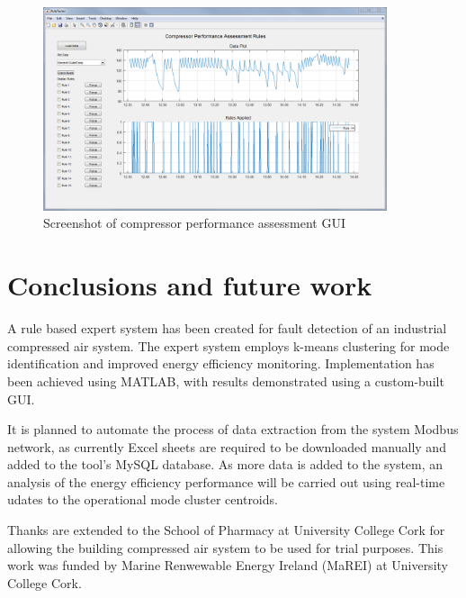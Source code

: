\begin{figure}
\includegraphics[width = 0.9\textwidth]{./Images/RuleTester.png}
\caption{Screenshot of compressor performance assessment GUI}
\label{fig:ruletester}
\end{figure}


\section{Conclusions and future work}
\label{sec:conclusions}
A rule based expert system has been created for fault detection of an industrial compressed air system. The expert system employs k-means clustering for mode identification and improved energy efficiency monitoring. Implementation has been achieved using MATLAB, with results demonstrated using a custom-built GUI.

It is planned to automate the process of data extraction from the system Modbus network, as currently Excel sheets are required to be downloaded manually and added to the tool's MySQL database. As more data is added to the system, an analysis of the energy efficiency performance will be carried out using real-time udates to the operational mode cluster centroids.


\begin{acknowledgements}
Thanks are extended to the School of Pharmacy at University College Cork for allowing the building compressed air system to be used for trial purposes. This work was funded by Marine Renwewable Energy Ireland (MaREI) at University College Cork.
\end{acknowledgements}

%
%



